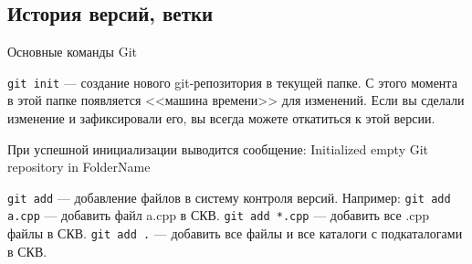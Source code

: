  
\subsection{История версий, ветки}
\begin{frame}[t]{Основные команды Git}

\texttt{git init} --- создание нового git-репозитория в текущей папке.
С этого момента в этой папке появляется <<машина времени>> для изменений.
Если вы сделали изменение и зафиксировали его, вы всегда можете откатиться к этой версии.

При успешной инициализации выводится сообщение:
Initialized empty Git repository in FolderName

\texttt{git add} --- добавление файлов в систему контроля версий.
Например: \texttt{git add a.cpp} --- добавить файл a.cpp в СКВ.
\texttt{git add *.cpp} --- добавить все .cpp файлы в СКВ. 
\texttt{git add .} --- добавить все файлы и все каталоги с подкаталогами в СКВ. 

\end{frame}

                                         
